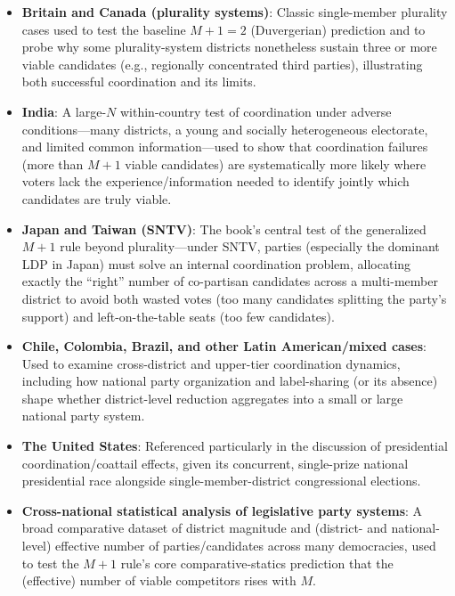 \documentclass[12pt]{article}
\begin{document}
\begin{itemize}[leftmargin=*, itemsep=4pt]
    \item \textbf{Britain and Canada (plurality systems)}: Classic single-member plurality cases used to test the baseline $M+1=2$ (Duvergerian) prediction and to probe why some plurality-system districts nonetheless sustain three or more viable candidates (e.g., regionally concentrated third parties), illustrating both successful coordination and its limits.
    \item \textbf{India}: A large-$N$ within-country test of coordination under adverse conditions---many districts, a young and socially heterogeneous electorate, and limited common information---used to show that coordination failures (more than $M+1$ viable candidates) are systematically more likely where voters lack the experience/information needed to identify jointly which candidates are truly viable.
    \item \textbf{Japan and Taiwan (SNTV)}: The book's central test of the generalized $M+1$ rule beyond plurality---under SNTV, parties (especially the dominant LDP in Japan) must solve an internal coordination problem, allocating exactly the ``right'' number of co-partisan candidates across a multi-member district to avoid both wasted votes (too many candidates splitting the party's support) and left-on-the-table seats (too few candidates).
    \item \textbf{Chile, Colombia, Brazil, and other Latin American/mixed cases}: Used to examine cross-district and upper-tier coordination dynamics, including how national party organization and label-sharing (or its absence) shape whether district-level reduction aggregates into a small or large national party system.
    \item \textbf{The United States}: Referenced particularly in the discussion of presidential coordination/coattail effects, given its concurrent, single-prize national presidential race alongside single-member-district congressional elections.
    \item \textbf{Cross-national statistical analysis of legislative party systems}: A broad comparative dataset of district magnitude and (district- and national-level) effective number of parties/candidates across many democracies, used to test the $M+1$ rule's core comparative-statics prediction that the (effective) number of viable competitors rises with $M$.
\end{itemize}

\end{document}
